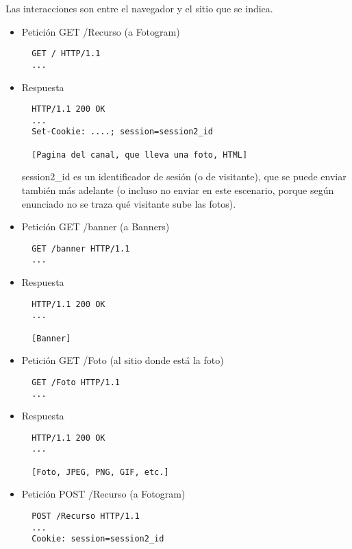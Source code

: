 Las interacciones son entre el navegador y el sitio que se indica.

\begin{itemize}
\item Petición GET /Recurso (a Fotogram)

\begin{verbatim}
  GET / HTTP/1.1
  ...
\end{verbatim}

\item Respuesta

\begin{verbatim}
  HTTP/1.1 200 OK
  ...
  Set-Cookie: ....; session=session2_id

  [Pagina del canal, que lleva una foto, HTML]
\end{verbatim}

session2\_id es un identificador de sesión (o de visitante), que se puede enviar también más adelante (o incluso no enviar en este escenario, porque según enunciado no se traza qué visitante sube las fotos).

\item Petición GET /banner (a Banners)

\begin{verbatim}
  GET /banner HTTP/1.1
  ...
\end{verbatim}

\item Respuesta

\begin{verbatim}
  HTTP/1.1 200 OK
  ...

  [Banner]
\end{verbatim}

\item Petición GET /Foto (al sitio donde está la foto)

\begin{verbatim}
  GET /Foto HTTP/1.1
  ...
\end{verbatim}

\item Respuesta

\begin{verbatim}
  HTTP/1.1 200 OK
  ...

  [Foto, JPEG, PNG, GIF, etc.]
\end{verbatim}


\item Petición POST /Recurso (a Fotogram)

\begin{verbatim}
  POST /Recurso HTTP/1.1
  ...
  Cookie: session=session2_id


\end{verbatim}
\end{itemize}
